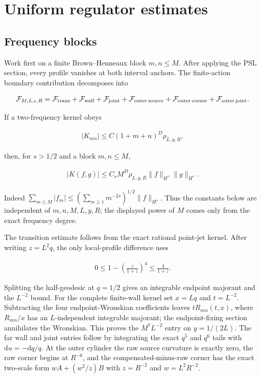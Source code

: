 \section{Uniform regulator estimates}\label{app:regulator-estimates}

\subsection{Frequency blocks}

Work first on a finite Brown--Henneaux block $m,n\leq M$. After applying the PSL section, every profile vanishes at both interval anchors. The finite-action boundary contribution decomposes into

\begin{align}
\mathcal F_{M,L,\epsilon,R}
=\mathcal F_{\rm trans}
+\mathcal F_{\rm wall}
+\mathcal F_{\rm joint}
+\mathcal F_{\rm outer\,source}
+\mathcal F_{\rm outer\,corner}
+\mathcal F_{\rm outer\,joint}.
\end{align}

If a two-frequency kernel obeys

\begin{align}
|K_{mn}|\leq C(1+m+n)^D\rho_{L,y,R},
\end{align}

then, for $s>1/2$ and a block $m,n\leq M$,

\begin{align}
|K(f,g)|
\leq C_sM^D\rho_{L,y,R}
\|f\|_{H^s}\|g\|_{H^s}. \label{eq:block-summation}
\end{align}

Indeed $\sum_{m\leq M}|f_m|\leq(\sum_{m\geq1}m^{-2s})^{1/2}\|f\|_{H^s}$. Thus the constants below are independent of $m,n,M,L,y,R$; the displayed power of $M$ comes only from the exact frequency degree.

The transition estimate follows from the exact rational point-jet kernel. After writing $z=L^2q$, the only local-profile difference uses

\begin{align}
0\leq1-\left(\frac z{1+z}\right)^4\leq\frac4{1+z}.
\end{align}

Splitting the half-geodesic at $q=1/2$ gives an integrable endpoint majorant and the $L^{-2}$ bound. For the complete finite-wall kernel set $x=Lq$ and $t=L^{-2}$. Subtracting the four endpoint-Wronskian coefficients leaves $tR_{mn}(t,x)$, where $R_{mn}/x$ has an $L$-independent integrable majorant; the endpoint-fixing section annihilates the Wronskian. This proves the $M^7L^{-2}$ entry on $y=1/(2L)$. The far wall and joint entries follow by integrating the exact $q^5$ and $q^6$ tails with $\mathrm du=-\mathrm dq/q$. At the outer cylinder the raw source curvature is exactly zero, the raw corner begins at $R^{-6}$, and the compensated-minus-raw corner has the exact two-scale form $wA+(w^2/z)B$ with $z=R^{-2}$ and $w=L^2R^{-2}$.

